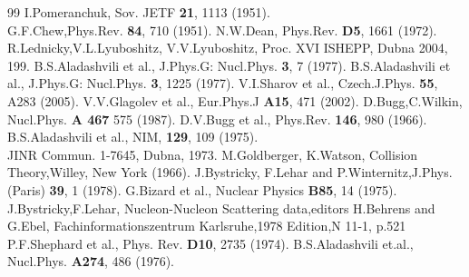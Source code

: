 \documentclass[a4paper,12pt]{article}
\begin{document}
\newpage
\begin {thebibliography} {99}
I.Pomeranchuk, Sov. JETF {\bf 21}, 1113 (1951).\\
  G.F.Chew,Phys.Rev. {\bf 84}, 710 (1951).
N.W.Dean, Phys.Rev. {\bf D5}, 1661 (1972).
R.Lednicky,V.L.Lyuboshitz, V.V.Lyuboshitz, Proc. XVI ISHEPP, Dubna
  2004, 199.
B.S.Aladashvili et al., J.Phys.G: Nucl.Phys. {\bf 3}, 7 (1977).
B.S.Aladashvili et al., J.Phys.G: Nucl.Phys. {\bf 3}, 1225 (1977).
V.I.Sharov et al., Czech.J.Phys. {\bf 55}, A283 (2005).
V.V.Glagolev et al., Eur.Phys.J {\bf A15}, 471 (2002).
D.Bugg,C.Wilkin, Nucl.Phys. {\bf A 467} 575 (1987).
D.V.Bugg et al., Phys.Rev. {\bf 146}, 980 (1966).
 B.S.Aladashvili et al., NIM, {\bf 129}, 109 (1975).\\
  JINR Commun. 1-7645, Dubna, 1973.
M.Goldberger, K.Watson, Collision Theory,Willey, New York (1966).
J.Bystricky, F.Lehar and P.Winternitz,J.Phys. (Paris) {\bf 39}, 1
  (1978).
G.Bizard et al., Nuclear Physics {\bf B85}, 14 (1975).
J.Bystricky,F.Lehar,  Nucleon-Nucleon Scattering data,editors
  H.Behrens and G.Ebel, Fachinformationszentrum Karlsruhe,1978 Edition,N 11-1,
  p.521
P.F.Shephard et al., Phys. Rev. {\bf D10}, 2735 (1974).
B.S.Aladashvili et.al., Nucl.Phys. {\bf A274}, 486 (1976).
\end {thebibliography}
\end{document}
